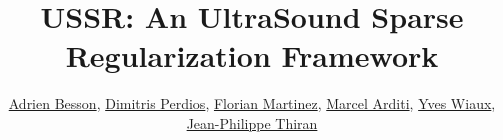 

\title[USSR]{USSR: An UltraSound Sparse Regularization Framework}

\author[short-author]{ %
	\href{mailto:adrien.besson@epfl.ch}{Adrien Besson\inst{\dagger}}, 
	\href{mailto:dimitris.perdios@epfl.ch}{Dimitris Perdios\inst{\dagger}},
	\href{mailto:florian.martinez@epfl.ch}{Florian Martinez\inst{\dagger}},
	\href{mailto:marcel.arditi@epfl.ch}{Marcel Arditi\inst{\dagger}},
	\href{mailto:Y.Wiaux@hw.ac.uk}{Yves Wiaux\inst{\ddagger}},
	\href{mailto:jeanphilippe.thiran@epfl.ch}{Jean-Philippe Thiran\inst{\dagger}\inst{\ast}}
}

